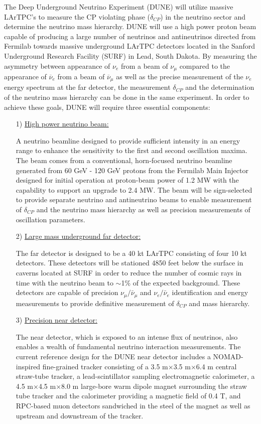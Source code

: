 The Deep Underground Neutrino Experiment (DUNE) \cite{if:DUNE} will utilize massive LArTPC's to measure the CP violating phase ($\delta_{CP}$) in the neutrino sector and determine the neutrino mass hierarchy. DUNE will use a high power proton beam capable of producing a large number of neutrinos and antineutrinos directed from Fermilab towards massive underground LArTPC detectors located in the Sanford Underground Research Facility (SURF) in Lead, South Dakota. By measuring the asymmetry between appearance of $\nu_{e}$ from a beam of $\nu_{\mu}$ compared to the appearance of $\overline{\nu}_{e}$ from a beam of $\overline{\nu}_{\mu}$ as well as the precise measurement of the $\nu_{e}$ energy spectrum at the far detector, the measurement $\delta_{CP}$ and the determination of the neutrino mass hierarchy can be done in the same experiment. In order to achieve these goals, DUNE will require three essential components:
\begin{itemize}
\item[1)] \underline{High power neutrino beam:}

A neutrino beamline designed to provide sufficient intensity in an energy range to enhance the sensitivity to the first and second oscillation maxima. The beam comes from a conventional, horn-focused neutrino beamline generated from 60 GeV - 120 GeV protons from the Fermilab Main Injector designed for initial operation at proton-beam power of 1.2 MW with the capability to support an upgrade to 2.4 MW. The beam will be sign-selected to provide separate neutrino and antineutrino beams to enable measurement of $\delta_{CP}$ and the neutrino mass hierarchy as well as precision measurements of oscillation parameters.

\item[2)] \underline{Large mass underground far detector:}

The far detector is designed to be a 40 kt LArTPC consisting of four 10 kt detectors. These detectors will be stationed 4850 feet below the surface in caverns located at SURF in order to reduce the number of cosmic rays in time with the neutrino beam to $\sim$1$\%$ of the expected background. These detectors are capable of precision ${\nu}_{\mu} / \bar{\nu}_{\mu}$ and ${\nu}_{e} / \bar{\nu}_{e}$ identification and energy measurements to provide definitive measurement of $\delta_{CP}$ and mass hierarchy.

\item[3)] \underline{Precision near detector:}

The near detector, which is exposed to an intense flux of neutrinos, also enables a wealth of fundamental neutrino interaction measurements. The current reference design for the DUNE near detector includes a NOMAD-inspired \cite{if:nomad} fine-grained tracker consisting of a 3.5 m$\times$3.5 m$\times$6.4 m central straw-tube tracker, a lead-scintillator sampling electromagnetic calorimeter, a 4.5 m$\times$4.5 m$\times$8.0 m large-bore warm dipole magnet surrounding the straw tube tracker and the calorimeter providing a magnetic field of 0.4 T, and RPC-based muon detectors sandwiched in the steel of the magnet as well as upstream and downstream of the tracker.

\end{itemize}

